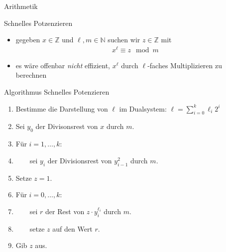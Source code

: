 \documentclass[aspectratio=1610, 11pt]{beamer}
\newcommand\NN{\mathbb N}
\newcommand\ZZ{\mathbb Z}
\begin{document}
\begin{frame}{Arithmetik}
	\begin{overprint}
		\begin{exampleblock}{Schnelles Potzenzieren}
			\begin{itemize}
				\item gegeben $x\in\ZZ$ und $\ell,m\in\NN$ suchen wir $z\in\ZZ$ mit
					\begin{align*}
						x^\ell\equiv z\mod m
					\end{align*}
				\item es w\"are offenbar \emph{nicht} effizient, $x^\ell$ durch $\ell$-faches Multiplizieren zu berechnen
			\end{itemize}
		\end{exampleblock}
		\begin{exampleblock}{Algorithmus Schnelles Potenzieren}
			\begin{enumerate}
				\item Bestimme die Darstellung von $\ell$ im Dualsystem: $\ell=\sum_{i=0}^k\ell_i2^i$
				\item Sei $y_0$ der Divisonsrest von $x$ durch $m$.
				\item F\"ur $i=1,\ldots,k$:
				\item $\qquad$sei $y_i$ der Divisionsrest von $y_{i-1}^2$ durch $m$.
				\item Setze $z=1$.
				\item F\"ur $i=0,\ldots,k$:
				\item $\qquad$sei $r$ der Rest von $z\cdot y_i^{\ell_i}$ durch $m$.
				\item $\qquad$setze $z$ auf den Wert $r$.
				\item Gib $z$ aus.
			\end{enumerate}
		\end{exampleblock}
	\end{overprint}
\end{frame}
\end{document}
